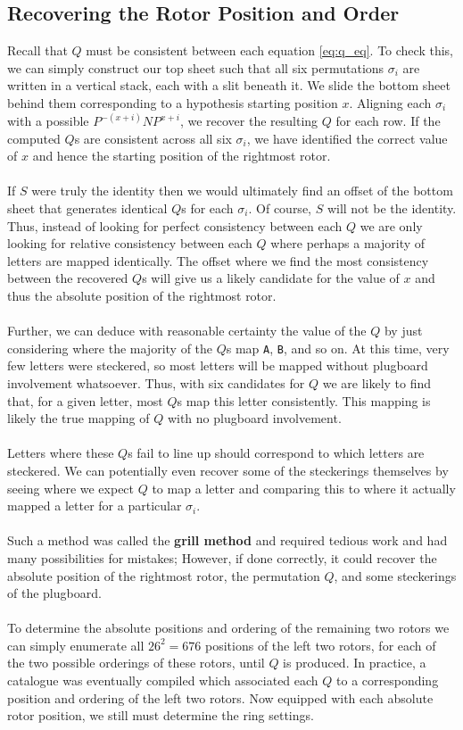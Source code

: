 \subsection{Recovering the Rotor Position and Order}
\noindent Recall that $Q$ must be consistent between
each equation \ref{eq:q_eq}. To check this, we can simply construct our top sheet such that all six permutations $\sigma_i$ are written in a vertical stack, each with a slit beneath it. We slide the bottom sheet behind them corresponding to a hypothesis starting position $x$. Aligning each $\sigma_i$ with a possible $P^{-(x+i)}NP^{x+i}$, we recover the resulting $Q$ for each row. If the computed $Q$s are consistent across all six $\sigma_i$, we have identified the correct value of $x$ and hence the starting position of the rightmost rotor.
\\\\If $S$ were truly the identity then we would ultimately find an
offset of the bottom sheet that generates identical $Q$s for each $\sigma_i$. Of course,
$S$ will not be the identity. Thus, instead of looking for perfect
consistency between each $Q$ we are only looking for relative
consistency between each $Q$ where perhaps a majority of letters are mapped identically. The offset where we find the most consistency between the recovered $Q$s will give us a likely candidate for the value of $x$ and thus the absolute position of the rightmost rotor. 
\\\\Further, we can
deduce with reasonable certainty the value of the $Q$ by just
considering where the majority of the $Q$s map \texttt{A},
\texttt{B}, and so on. At this time, very few letters were steckered, so most letters will be mapped without plugboard involvement whatsoever. Thus, with six candidates for $Q$ we are likely to find that, for a given letter, most $Q$s map this letter consistently. This mapping is likely the true mapping of $Q$ with no plugboard involvement. 
\\\\Letters where these $Q$s fail to line up should correspond to which letters are steckered. We can potentially even recover some of the steckerings themselves by seeing where we expect $Q$ to map a letter and comparing this to where it actually mapped a letter for a particular $\sigma_i$. 
\\\\Such a method was called the {\bf{grill
method}} and required tedious work and had many possibilities for mistakes; However, if done correctly, it could recover the absolute position of the rightmost rotor, the permutation $Q$, and some steckerings of the plugboard.
\\\\To determine the absolute positions and ordering of the remaining two rotors
we can simply enumerate all $26^2 = 676$ positions of the left two
rotors, for each of the two possible orderings of these rotors, until $Q$ is
produced. In practice, a catalogue was eventually compiled which
associated each $Q$ to a corresponding position and ordering of the
left two rotors. Now equipped with each absolute rotor position, we
still must determine the ring settings.
